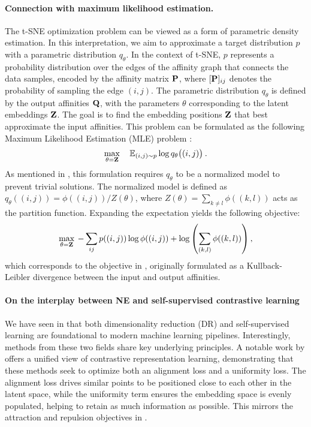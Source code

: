 \paragraph{Connection with maximum likelihood estimation.}
The t-SNE optimization problem can be viewed as a form of parametric density estimation. In this interpretation, we aim to approximate a target distribution $p$ with a parametric distribution $q_{\theta}$. In the context of t-SNE, $p$ represents a probability distribution over the edges of the affinity graph that connects the data samples, encoded by the affinity matrix ${\mathbf{P}}$, where $[{\mathbf{P}}]_{ij}$ denotes the probability of sampling the edge $(i,j)$. The parametric distribution $q_{\theta}$ is defined by the output affinities ${\mathbf{Q}}$, with the parameters $\theta$ corresponding to the latent embeddings ${\mathbf{Z}}$. The goal is to find the embedding positions ${\mathbf{Z}}$ that best approximate the input affinities. This problem can be formulated as the following Maximum Likelihood Estimation (MLE) problem \citep{damrich2022t}:
\begin{align}
    \max_{\theta = {\mathbf{Z}}} \quad \mathbb{E}_{(i,j) \sim p} \log q_{\theta} \big( (i,j) \big) \:.
\end{align}
As mentioned in , this formulation requires $q_{\theta}$ to be a normalized model to prevent trivial solutions. The normalized model is defined as $q_{\theta}((i,j)) = \phi((i,j)) / Z(\theta)$, where $Z(\theta) = \sum_{k \neq l} \phi((k,l))$ acts as the partition function. Expanding the expectation yields the following objective:
\begin{align}
    \max_{\theta = {\mathbf{Z}}}  \: - \sum_{ij} p((i,j)) \log \phi((i,j)) + \log \left( \sum_{(k,l)} \phi((k,l)) \right),
\end{align}
which corresponds to the objective in , originally formulated as a Kullback-Leibler divergence between the input and output affinities.


\paragraph{On the interplay between NE and self-supervised contrastive learning} We have seen in  that both dimensionality reduction (DR) and self-supervised learning are foundational to modern machine learning pipelines. Interestingly, methods from these two fields share key underlying principles. A notable work by \citet{wang2020understanding} offers a unified view of contrastive representation learning, demonstrating that these methods seek to optimize both an alignment loss and a uniformity loss. The alignment loss drives similar points to be positioned close to each other in the latent space, while the uniformity term ensures the embedding space is evenly populated, helping to retain as much information as possible. This mirrors the attraction and repulsion objectives in .

